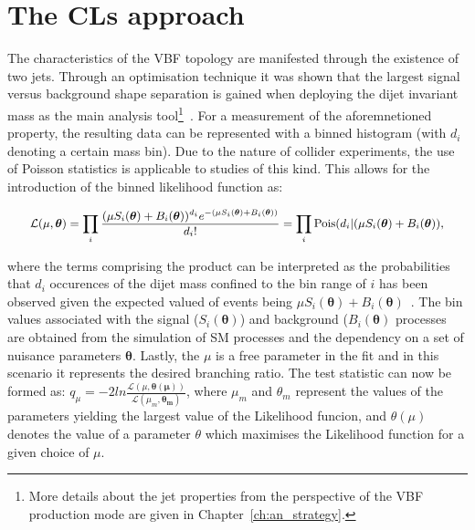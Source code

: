 \section{The CLs approach}

\hspace{10pt} The characteristics of the VBF topology are manifested through the existence of two jets. Through an optimisation technique it was shown that the largest signal versus background shape separation is gained when deploying the dijet invariant mass as the main analysis tool\footnote{More details about the jet properties from the perspective of the VBF production mode are given in Chapter~\ref{ch:an_strategy}.}~\cite{paper:HIG_17_023,Riccardo}. For a measurement of the aforemnetioned property, the resulting data can be represented with a binned histogram (with $d_i$ denoting a certain mass bin). Due to the nature of collider experiments, the use of Poisson statistics is applicable to studies of this kind. This allows for the introduction of the binned likelihood function as:

\begin{equation}
   \small{\mathcal{L}(\mu, \boldsymbol{\theta}) = \prod_i \frac{(\mu S_i(\boldsymbol{\theta})+B_i(\boldsymbol{\theta}))^{d_i}e^{-(\mu S_i(\boldsymbol{\theta})+B_i(\boldsymbol{\theta}))}}{d_i!} = \prod_i \text{Pois}(d_i|(\mu S_i(\boldsymbol{\theta})+B_i(\boldsymbol{\theta})),}
    \label{eq:likelihood_def}
\end{equation}

where the terms comprising the product can be interpreted as the probabilities that $d_i$ occurences of the dijet mass confined to the bin range of $i$ has been observed given the expected valued of events being $\mu S_i(\boldsymbol{\theta})+B_i(\boldsymbol{\theta})$~\cite{paper:stat_overview,paper:cls_intro}. The bin values associated with the signal ($S_i(\boldsymbol{\theta})$) and background ($B_i(\boldsymbol{\theta})$ processes are obtained from the simulation of SM processes and the dependency on a set of nuisance parameters $\boldsymbol{\theta}$. Lastly, the $\mu$ is a free parameter in the fit and in this scenario it represents the desired branching ratio. The test statistic can now be formed as: $q_\mu = -2ln\frac{\mathcal{L}(\mu, \boldsymbol{\theta(\mu)})}{\mathcal{L}(\mu_m, \boldsymbol{\theta_m})}$, where $\mu_m$ and $\theta_m$ represent the values of the parameters yielding the largest value of the Likelihood funcion, and $\theta(\mu)$ denotes the value of a parameter $\theta$ which maximises the Likelihood function for a given choice of $\mu$. 

